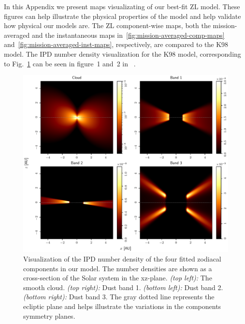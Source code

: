 \documentclass[twocolumn]{aa}
\begin{document}
In this Appendix we present maps visualizating of our best-fit ZL 
model. These figures can help illustrate the physical properties 
of the model and help validate how physical our models are. The ZL 
component-wise maps, both the mission-averaged and the instantaneous maps 
in~\ref{fig:mission-averaged-comp-maps} 
and~\ref{fig:mission-averaged-inst-maps}, respectively, are compared to 
the K98 model. The IPD number density visualization for the K98 model, 
corresponding to Fig.~\ref{fig:ipd-number-density} can be seen in 
figure~1 and~2 in~\cite{San2022} .



\begin{figure}
    \centering
    \includegraphics[width=\textwidth]{figs/number_density.pdf}
    \caption{Visualization of the IPD number density of the four fitted zodiacal components in our model. The number densities are shown as a cross-section of the Solar system in the xz-plane. \textit{(top left):} The smooth cloud. \textit{(top right):} Dust band 1. \textit{(bottom left):} Dust band 2. \textit{(bottom right):} Dust band 3. The gray dotted line represents the ecliptic plane and helps illustrate the variations in the components symmetry planes.}
    \label{fig:ipd-number-density}
\end{figure}
\end{document}
